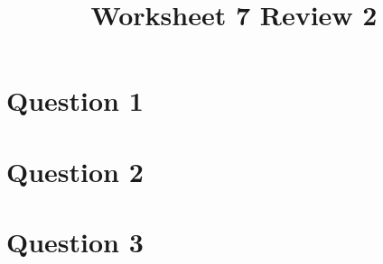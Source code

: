 \documentclass[12pt]{article}
\begin{document}
\title{Worksheet 7 Review 2}
\maketitle

\section*{Question 1}

\section*{Question 2}

\section*{Question 3}
\end{document}
